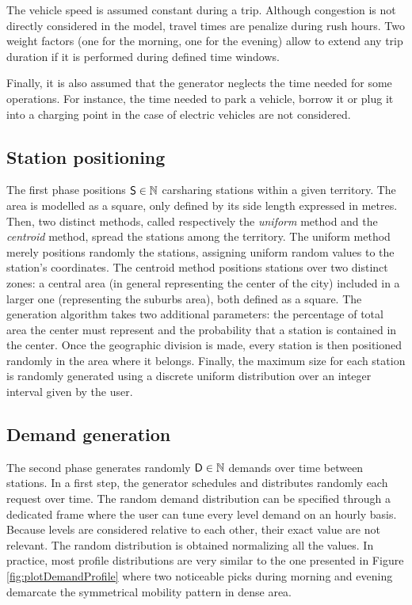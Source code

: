 \begin{bibunit}[ieeetr]
\medskip
The vehicle speed is assumed constant during a trip.
Although congestion is not directly considered in the model, travel times are penalize during rush hours.
Two weight factors (one for the morning, one for the evening) allow to extend any trip duration if it is performed during defined time windows.

\medskip
Finally, it is also assumed that the generator neglects the time needed for some operations.
For instance, the time needed to park a vehicle, borrow it or plug it into a charging point in the case of electric vehicles are not considered.


\subsection{Station positioning}
The first phase positions $\mathsf{S} \in \mathbb{N}$ carsharing stations within a given territory.
The area is modelled as a square, only defined by its side length expressed in metres.
Then, two distinct methods, called respectively the \emph{uniform} method and the \emph{centroid} method, spread the stations among the territory.
The uniform method merely positions randomly the stations, assigning uniform random values to the station's coordinates.
The centroid method positions stations over two distinct zones: a central area (in general representing the center of the city) included in a larger one (representing the suburbs area), both defined as a square.
The generation algorithm takes two additional parameters: the percentage of total area the center must represent and the probability that a station is contained in the center.
Once the geographic division is made, every station is then positioned randomly in the area where it belongs. 
Finally, the maximum size for each station is randomly generated using a discrete uniform distribution over an integer interval given by the user. %


\subsection{Demand generation}
The second phase generates randomly $\mathsf{D} \in \mathbb{N}$ demands over time between stations.
In a first step, the generator schedules and distributes randomly each request over time.
The random demand distribution can be specified through a dedicated frame where the user can tune every level demand on an hourly basis.
Because levels are considered relative to each other, their exact value are not relevant.
The random distribution is obtained normalizing all the values. %
In practice, most profile distributions are very similar to the one presented in Figure \ref{fig:plotDemandProfile} where two noticeable picks during morning and evening demarcate the symmetrical mobility pattern in dense area.


\end{bibunit}
